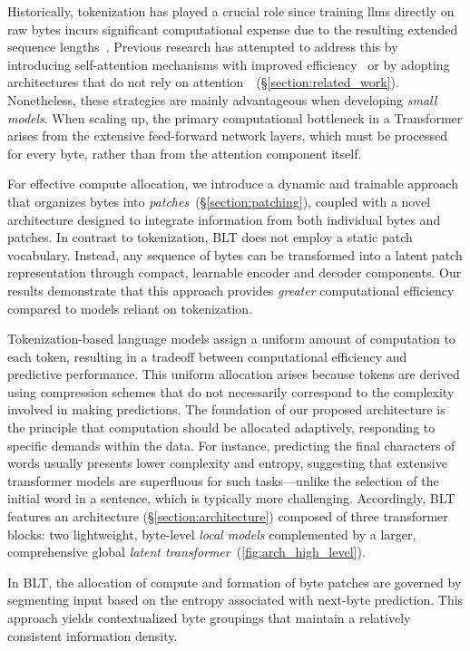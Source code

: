 Historically, tokenization has played a crucial role since training llms directly on raw bytes incurs significant computational expense due to the resulting extended sequence lengths~\citep{xue2022byt5}. Previous research has attempted to address this by introducing self-attention mechanisms with improved efficiency~\citep{el2020characterbert, clark2022canine} or by adopting architectures that do not rely on attention~\citep{wang2024mambabyte}~(\S\ref{section:related_work}). Nonetheless, these strategies are mainly advantageous when developing \textit{small models}. When scaling up, the primary computational bottleneck in a Transformer arises from the extensive feed-forward network layers, which must be processed for every byte, rather than from the attention component itself.

For effective compute allocation, we introduce a dynamic and trainable approach that organizes bytes into \textit{patches}~(\S\ref{section:patching}), coupled with a novel architecture designed to integrate information from both individual bytes and patches. In contrast to tokenization, {\textsc BLT} does not employ a static patch vocabulary. Instead, any sequence of bytes can be transformed into a latent patch representation through compact, learnable encoder and decoder components. Our results demonstrate that this approach provides \textit{greater} computational efficiency compared to models reliant on tokenization.

Tokenization-based language models assign a uniform amount of computation to each token, resulting in a tradeoff between computational efficiency and predictive performance. This uniform allocation arises because tokens are derived using compression schemes that do not necessarily correspond to the complexity involved in making predictions. The foundation of our proposed architecture is the principle that computation should be allocated adaptively, responding to specific demands within the data. For instance, predicting the final characters of words usually presents lower complexity and entropy, suggesting that extensive transformer models are superfluous for such tasks—unlike the selection of the initial word in a sentence, which is typically more challenging. Accordingly, {\textsc BLT} features an architecture (\S\ref{section:architecture}) composed of three transformer blocks: two lightweight, byte-level \textit{local models} complemented by a larger, comprehensive global \textit{latent transformer}~(\autoref{fig:arch_high_level}). 

In {\textsc BLT}, the allocation of compute and formation of byte patches are governed by segmenting input based on the entropy associated with next-byte prediction. This approach yields contextualized byte groupings that maintain a relatively consistent information density.

